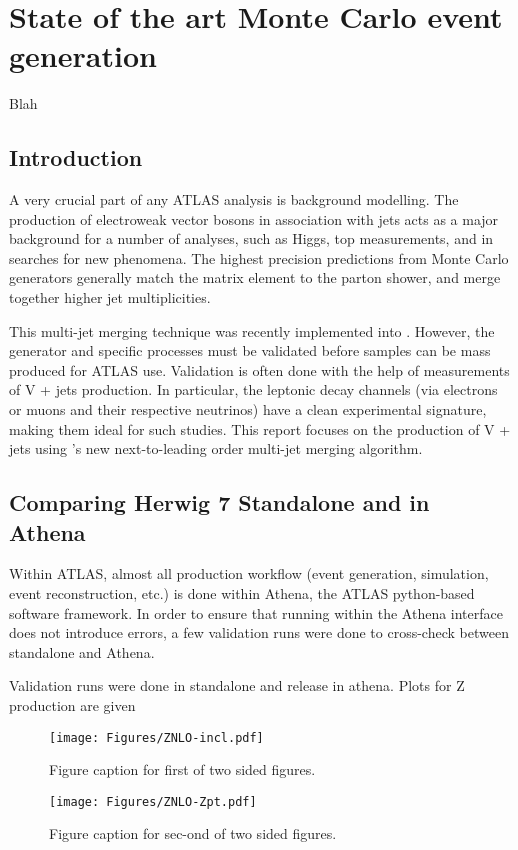 \chapter{State of the art Monte Carlo event generation}
\label{chap:pheno}

%
{Blah}

\section{Introduction}
A very crucial part of any ATLAS analysis is background modelling. The production of electroweak vector bosons in association with jets acts as a major background for a number of analyses, such as Higgs, top measurements, and in searches for new phenomena. The highest precision predictions from Monte Carlo generators generally match the matrix element to the parton shower, and merge together higher jet multiplicities. 

This multi-jet merging technique was recently implemented into . However, the generator and specific processes must be validated before samples can be mass produced for ATLAS use. Validation is often done with the help of measurements of V + jets production. In particular, the leptonic decay channels (via electrons or muons and their respective neutrinos) have a clean experimental signature, making them ideal for such studies. This report focuses on the production of V + jets using 's new next-to-leading order multi-jet merging algorithm.

\section{Comparing Herwig 7 Standalone and in Athena}
\noindent
Within ATLAS, almost all production workflow (event generation, simulation, event reconstruction, etc.) is done within Athena, the ATLAS python-based software framework. In order to ensure that running  within the Athena interface does not introduce errors, a few validation runs were done to cross-check between  standalone and Athena. 

Validation runs were done in  standalone and  release in athena. Plots for Z production are given 

\begin{figure}[h]
\begin{minipage}{17pc}
\texttt{[image: Figures/ZNLO-incl.pdf]}
\caption{Figure caption for first of two sided figures.}
\end{minipage}\hspace{2pc}
\begin{minipage}{17pc}
\texttt{[image: Figures/ZNLO-Zpt.pdf]}
\caption{Figure caption for sec-ond of two sided figures.}
\end{minipage} 
\end{figure}


